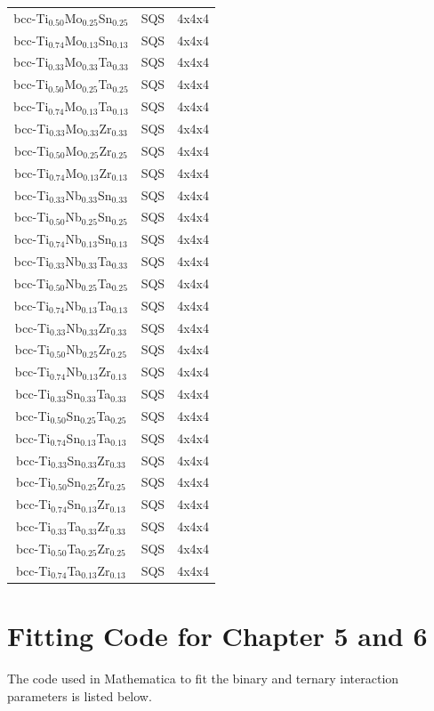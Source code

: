 \begin{longtable}[H]{ c c c }
	bcc-Ti$_{0.50}$Mo$_{0.25}$Sn$_{0.25}$ & SQS & 4x4x4\\
	bcc-Ti$_{0.74}$Mo$_{0.13}$Sn$_{0.13}$ & SQS & 4x4x4\\
	bcc-Ti$_{0.33}$Mo$_{0.33}$Ta$_{0.33}$ & SQS & 4x4x4\\
	bcc-Ti$_{0.50}$Mo$_{0.25}$Ta$_{0.25}$ & SQS & 4x4x4\\
	bcc-Ti$_{0.74}$Mo$_{0.13}$Ta$_{0.13}$ & SQS & 4x4x4\\
	bcc-Ti$_{0.33}$Mo$_{0.33}$Zr$_{0.33}$ & SQS & 4x4x4\\
	bcc-Ti$_{0.50}$Mo$_{0.25}$Zr$_{0.25}$ & SQS & 4x4x4\\
	bcc-Ti$_{0.74}$Mo$_{0.13}$Zr$_{0.13}$ & SQS & 4x4x4\\
	bcc-Ti$_{0.33}$Nb$_{0.33}$Sn$_{0.33}$ & SQS & 4x4x4\\
	bcc-Ti$_{0.50}$Nb$_{0.25}$Sn$_{0.25}$ & SQS & 4x4x4\\
	bcc-Ti$_{0.74}$Nb$_{0.13}$Sn$_{0.13}$ & SQS & 4x4x4\\
	bcc-Ti$_{0.33}$Nb$_{0.33}$Ta$_{0.33}$ & SQS & 4x4x4\\
	bcc-Ti$_{0.50}$Nb$_{0.25}$Ta$_{0.25}$ & SQS & 4x4x4\\
	bcc-Ti$_{0.74}$Nb$_{0.13}$Ta$_{0.13}$ & SQS & 4x4x4\\
	bcc-Ti$_{0.33}$Nb$_{0.33}$Zr$_{0.33}$ & SQS & 4x4x4\\
	bcc-Ti$_{0.50}$Nb$_{0.25}$Zr$_{0.25}$ & SQS & 4x4x4\\
	bcc-Ti$_{0.74}$Nb$_{0.13}$Zr$_{0.13}$ & SQS & 4x4x4\\
	bcc-Ti$_{0.33}$Sn$_{0.33}$Ta$_{0.33}$ & SQS & 4x4x4\\
	bcc-Ti$_{0.50}$Sn$_{0.25}$Ta$_{0.25}$ & SQS & 4x4x4\\
	bcc-Ti$_{0.74}$Sn$_{0.13}$Ta$_{0.13}$ & SQS & 4x4x4\\
	bcc-Ti$_{0.33}$Sn$_{0.33}$Zr$_{0.33}$ & SQS & 4x4x4\\
	bcc-Ti$_{0.50}$Sn$_{0.25}$Zr$_{0.25}$ & SQS & 4x4x4\\
	bcc-Ti$_{0.74}$Sn$_{0.13}$Zr$_{0.13}$ & SQS & 4x4x4\\
	bcc-Ti$_{0.33}$Ta$_{0.33}$Zr$_{0.33}$ & SQS & 4x4x4\\
	bcc-Ti$_{0.50}$Ta$_{0.25}$Zr$_{0.25}$ & SQS & 4x4x4\\
	bcc-Ti$_{0.74}$Ta$_{0.13}$Zr$_{0.13}$ & SQS & 4x4x4\\
	\hline
\end{longtable}
\clearpage

\section*{Fitting Code for Chapter 5 and 6}
The code used in Mathematica to fit the binary and ternary interaction parameters is listed below.

